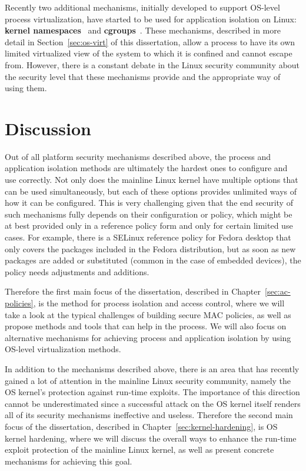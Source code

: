 Recently two additional mechanisms, initially developed to support OS-level process virtualization, have started to be used for application isolation on Linux: \textbf{kernel namespaces}~\cite{biederman2006} and \textbf{cgroups}~\cite{cgroupsv2}. These mechanisms, described in more detail in Section~\ref{sec:os-virt} of this dissertation, allow a process to have its own limited virtualized view of the system to which it is confined and cannot escape from. However, there is a constant debate in the Linux security community about the security level that these mechanisms provide and the appropriate way of using them.   

\section{Discussion}

Out of all platform security mechanisms described above, the process and application isolation methods are ultimately the hardest ones to configure and use correctly. Not only does the mainline Linux kernel have multiple options that can be used simultaneously, but each of these options provides unlimited ways of how it can be configured. This is very challenging given that the end security of such mechanisms fully depends on their configuration or policy, which might be at best provided only in a reference policy form and only for certain limited use cases. For example, there is a SELinux reference policy for Fedora desktop that only covers the packages included in the Fedora distribution, but as soon as new packages are added or substituted (common in the case of embedded devices), the policy needs adjustments and additions. 

Therefore the first main focus of the dissertation, described in Chapter~\ref{sec:ac-policies}, is the method for process isolation and access control, where we will take a look at the typical challenges of building secure MAC policies, as well as propose methods and tools that can help in the process. We will also focus on alternative mechanisms for achieving process and application isolation by using OS-level virtualization methods. 

In addition to the mechanisms described above, there is an area that has recently gained a lot of attention in the mainline Linux security community, namely the OS kernel's protection against run-time exploits. The importance of this direction cannot be underestimated since a successful attack on the OS kernel itself renders all of its security mechanisms ineffective and useless. Therefore the second main focus of the dissertation, described in Chapter~\ref{sec:kernel-hardening}, is OS kernel hardening, where we will discuss the overall ways to enhance the run-time exploit protection of the mainline Linux kernel, as well as present concrete mechanisms for achieving this goal. 
 